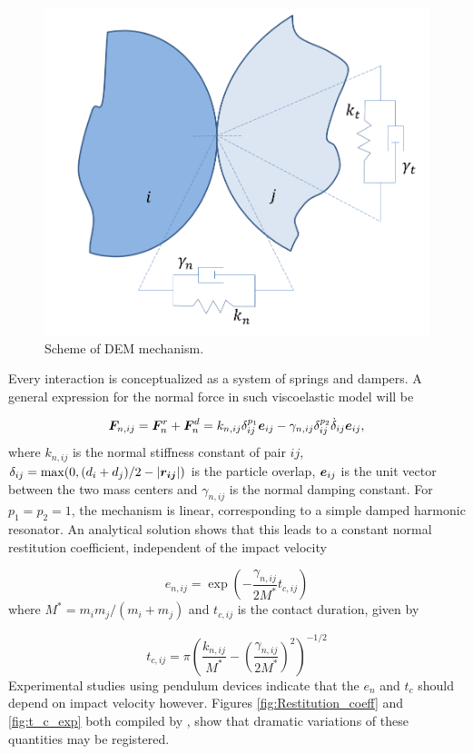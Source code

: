 %
\begin{figure}[ht!]
	\centering
	\includegraphics[width=0.60\linewidth]{Figures/3.Chapter/DEM_contacts}
	\caption{Scheme of DEM mechanism.}
	\label{fig:dem_scheme} 
\end{figure}
%
Every interaction is conceptualized as a system of springs and dampers. A general expression for the normal force in such viscoelastic model will be

%
\begin{equation} \label{eq:normal_viscoelastic_I}
	\boldsymbol{F}_{n,ij}=\boldsymbol{F}_n^r+\boldsymbol{F}_n^d=k_{n,ij}\delta_{ij}^{p_1}\boldsymbol{e}_{ij}-\gamma_{n,ij}\delta_{ij}^{p_2}\dot{\delta}_{ij}\boldsymbol{e}_{ij},
\end{equation}
%
where $k_{n,ij}$ is the normal stiffness constant of pair $ij$, $\delta_{ij}=\max(0, (d_i+d_j)/2-|\boldsymbol{r_{ij}}|)$ is the particle overlap, $\boldsymbol{e}_{ij}$ is the unit vector between the two mass centers and $\gamma_{n,ij}$ is the normal damping constant. For $p_1=p_2=1$, the mechanism is linear, corresponding to a simple damped harmonic resonator. An analytical solution \citep{Shaefer-1996} shows that this leads to a constant normal restitution coefficient, independent of the impact velocity

%
\begin{equation} \label{eq:linear_restitution_coeff}
	e_{n,ij}=\exp\left( -\frac{\gamma_{n,ij}}{2M^*}t_{c,ij} \right)
\end{equation}
%
where $M^*={m_im_j}/({m_i+m_j})$ and $t_{c,ij}$ is the contact duration, given by

%
\begin{equation} \label{eq:linear_tc}
	t_{c,ij}=\pi \left( \frac{k_{n,ij}}{M^*}- \left( \frac{\gamma_{n,ij}}{2M^*} \right)^2 \right)^{-1/2}
\end{equation}
%
Experimental studies using pendulum devices indicate that the $e_n$ and $t_c$ should depend on impact velocity however. Figures \ref{fig:Restitution_coeff} and \ref{fig:t_c_exp} both compiled by \cite{Kruggel-Emden-2007}, show that dramatic variations of these quantities may be registered.

